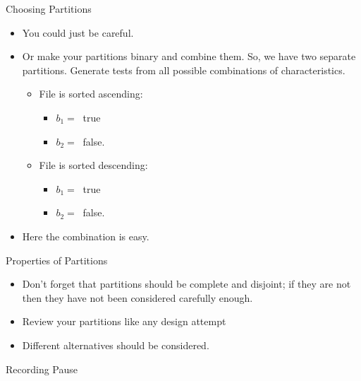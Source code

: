 \documentclass{beamer}
\newcommand{\pauseslide}{\begin{frame}{}
  \begin{center}
    Recording Pause
  \end{center}
  
\end{frame}}
\begin{document}
\begin{frame}{Choosing Partitions}

  \begin{itemize}
  \item You could just be careful.
  \item Or make your partitions binary and combine them. So, we have two
    separate partitions. Generate tests from all possible combinations of
    characteristics. 
    \begin{itemize}
    \item File is sorted ascending:
      \begin{itemize}
      \item $b_1 = \ $ true
      \item $b_2 = \ $ false.
      \end{itemize}
    \item File is sorted descending:
      \begin{itemize}
      \item $b_1 = \ $ true
      \item $b_2 = \ $ false.
      \end{itemize}
    \end{itemize}
    \item Here the combination  is easy. 
  \end{itemize} 
\end{frame}
\begin{frame}{Properties of Partitions}
  \begin{itemize}
  \item Don't forget that partitions should be complete and disjoint;
    if they are not then they have not been considered carefully
    enough.
    \item Review your partitions like any design attempt
    \item Different alternatives should be considered.
  \end{itemize}
\end{frame}

\pauseslide
\end{document}
